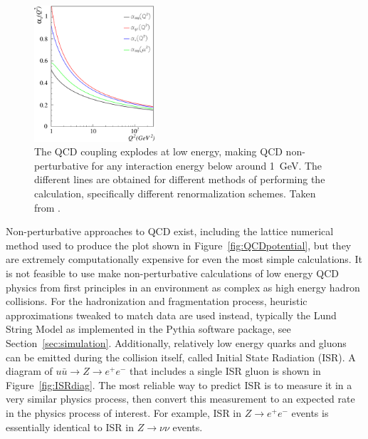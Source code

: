   \begin{figure}[h!]
    \centering
    \includegraphics[width=0.4\textwidth]{figures/qcd_coupling.pdf}
    \caption[The QCD coupling as a function of the interaction energy.]{
      The QCD coupling explodes at low energy, making QCD non-perturbative for any interaction energy below around 1~GeV.
      The different lines are obtained for different methods of performing the calculation, specifically different renormalization schemes.
      Taken from \cite{qcd_coupling}.}
    \label{fig:QCDcoupling}
  \end{figure}  

  Non-perturbative approaches to QCD exist, including the lattice numerical method used to produce the plot shown in Figure~\ref{fig:QCDpotential}, but they are extremely computationally expensive for even the most simple calculations.
  It is not feasible to use make non-perturbative calculations of low energy QCD physics from first principles in an environment as complex as high energy hadron collisions.
  For the hadronization and fragmentation process, heuristic approximations tweaked to match data are used instead, typically the Lund String Model as implemented in the Pythia software package, see Section~\ref{sec:simulation}.
  Additionally, relatively low energy quarks and gluons can be emitted during the collision itself, called Initial State Radiation (ISR).
  A diagram of $u\bar{u} \rightarrow Z \rightarrow e^+e^-$ that includes a single ISR gluon is shown in Figure~\ref{fig:ISRdiag}.
  The most reliable way to predict ISR is to measure it in a very similar physics process, then convert this measurement to an expected rate in the physics process of interest.
  For example, ISR in $Z\rightarrow e^+e^-$ events is essentially identical to ISR in $Z\rightarrow \nu\nu$ events.
  
